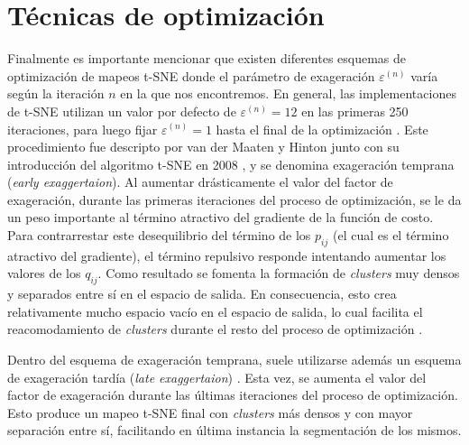 \section{Técnicas de optimización}\label{sec:tsne_optim}

Finalmente es importante mencionar que existen diferentes esquemas de optimización de mapeos t-SNE donde el parámetro de exageración $\varepsilon^{(n)}$ varía según la iteración $n$ en la que nos encontremos. En general, las implementaciones de t-SNE utilizan un valor por defecto de $\varepsilon^{(n)} = 12$ en las primeras 250 iteraciones, para luego fijar $\varepsilon^{(n)} = 1$ hasta el final de la optimización \cite{kobak_art}. Este procedimiento fue descripto por van der Maaten y Hinton junto con su introducción del algoritmo t-SNE en 2008 \cite{vdm_tsne}, y se denomina exageración temprana (\textit{early exaggertaion}). Al aumentar drásticamente el valor del factor de exageración, durante las primeras iteraciones del proceso de optimización, se le da un peso importante al término atractivo del gradiente de la función de costo. Para contrarrestar este desequilibrio del término de los $p_{ij}$ (el cual es el término atractivo del gradiente), el término repulsivo responde intentando aumentar los valores de los $q_{ij}$. Como resultado se fomenta la formación de \textit{clusters} muy densos y separados entre sí en el espacio de salida. En consecuencia, esto crea relativamente mucho espacio vacío en el espacio de salida, lo cual facilita el reacomodamiento de \textit{clusters} durante el resto del proceso de optimización \cite{vdm_tsne}.

Dentro del esquema de exageración temprana, suele utilizarse además un esquema de exageración tardía (\textit{late exaggertaion}) \cite{kobak_art, linderman_tsne}. Esta vez, se aumenta el valor del factor de exageración durante las últimas iteraciones del proceso de optimización. Esto produce un mapeo t-SNE final con \textit{clusters} más densos y con mayor separación entre sí, facilitando en última instancia la segmentación de los mismos.

